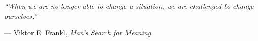 \cleardoublepage
\thispagestyle{empty}
\null\vfill

\begin{flushright}
  \begin{minipage}{0.7\textwidth}
    \raggedleft
    \itshape
    ``When we are no longer able to change a situation, we are challenged to
    change ourselves.''
    \par\vspace{1em}
    \upshape
    --- Viktor E. Frankl, \emph{Man's Search for Meaning}
  \end{minipage}
\end{flushright}

\vfill\vfill
\cleardoublepage
